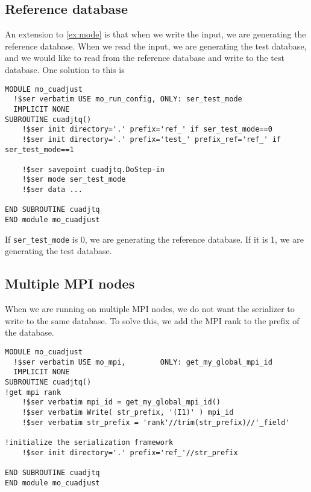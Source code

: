 \documentclass{article}
\begin{document}
\subsection{Reference database}
An extension to \ref{ex:mode} is that when we write the input, we are generating the reference database. When we read the input, we are generating the test database, and we would like to read from the reference database and write to the test database. One solution to this is
\begin{lstlisting}
MODULE mo_cuadjust
  !$ser verbatim USE mo_run_config, ONLY: ser_test_mode
  IMPLICIT NONE
SUBROUTINE cuadjtq()
    !$ser init directory='.' prefix='ref_' if ser_test_mode==0
    !$ser init directory='.' prefix='test_' prefix_ref='ref_' if ser_test_mode==1
    
    !$ser savepoint cuadjtq.DoStep-in
    !$ser mode ser_test_mode
    !$ser data ...

END SUBROUTINE cuadjtq
END module mo_cuadjust
\end{lstlisting}

If \texttt{ser\_test\_mode} is 0, we are generating the reference database. If it is 1, we are generating the test database.

\subsection{Multiple MPI nodes}
When we are running on multiple MPI nodes, we do not want the serializer to write to the same database. To solve this, we add the MPI rank to the prefix of the database.
\begin{lstlisting}
MODULE mo_cuadjust
  !$ser verbatim USE mo_mpi,        ONLY: get_my_global_mpi_id
  IMPLICIT NONE
SUBROUTINE cuadjtq()
!get mpi rank
    !$ser verbatim mpi_id = get_my_global_mpi_id()
    !$ser verbatim Write( str_prefix, '(I1)' ) mpi_id
    !$ser verbatim str_prefix = 'rank'//trim(str_prefix)//'_field'

!initialize the serialization framework
    !$ser init directory='.' prefix='ref_'//str_prefix

END SUBROUTINE cuadjtq
END module mo_cuadjust
\end{lstlisting}
\end{document}
